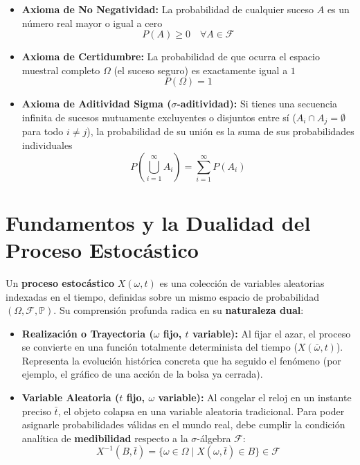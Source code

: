 \documentclass[10pt]{book}
\newcommand{\tbf}{\textbf}
\begin{document}
\begin{itemize}
    \item \tbf{Axioma de No Negatividad:} La probabilidad de cualquier suceso $A$ es un número real mayor o igual a cero
    \begin{equation*}
        P(A) \geq 0 \quad \forall A \in \mathcal{F}
    \end{equation*}
    \item \tbf{Axioma de Certidumbre:} La probabilidad de que ocurra el espacio muestral completo $\Omega$ (el suceso seguro) es exactamente igual a $1$
    \begin{equation*}
        P(\Omega) = 1
    \end{equation*}
    \item \tbf{Axioma de Aditividad Sigma ($\sigma$-aditividad):} Si tienes una secuencia infinita de sucesos mutuamente excluyentes o disjuntos entre sí ($A_i \cap A_j = \emptyset$ para todo $i \neq j$), la probabilidad de su unión es la suma de sus probabilidades individuales
    \begin{equation*}
        P\left(\bigcup_{i=1}^{\infty} A_i\right) = \sum_{i=1}^{\infty} P(A_i)
    \end{equation*}
\end{itemize}

\section{Fundamentos y la Dualidad del Proceso Estocástico}

Un \textbf{proceso estocástico} $X(\omega, t)$ es una colección de variables aleatorias indexadas en el tiempo, definidas sobre un mismo espacio de probabilidad $(\Omega, \mathcal{F}, \mathbb{P})$. Su comprensión profunda radica en su \textbf{naturaleza dual}:

\begin{itemize}
    \item \textbf{Realización o Trayectoria ($\omega$ fijo, $t$ variable):} Al fijar el azar, el proceso se convierte en una función totalmente determinista del tiempo ($X(\bar{\omega}, t)$). Representa la evolución histórica concreta que ha seguido el fenómeno (por ejemplo, el gráfico de una acción de la bolsa ya cerrada).
    \item \textbf{Variable Aleatoria ($t$ fijo, $\omega$ variable):} Al congelar el reloj en un instante preciso $\bar{t}$, el objeto colapsa en una variable aleatoria tradicional. Para poder asignarle probabilidades válidas en el mundo real, debe cumplir la condición analítica de \textbf{medibilidad} respecto a la $\sigma$-álgebra $\mathcal{F}$:
    \begin{equation}
        X^{-1}(B, \bar{t}) = \{ \omega \in \Omega \mid X(\omega, \bar{t}) \in B \} \in \mathcal{F}
    \end{equation}
\end{itemize}
\end{document}
